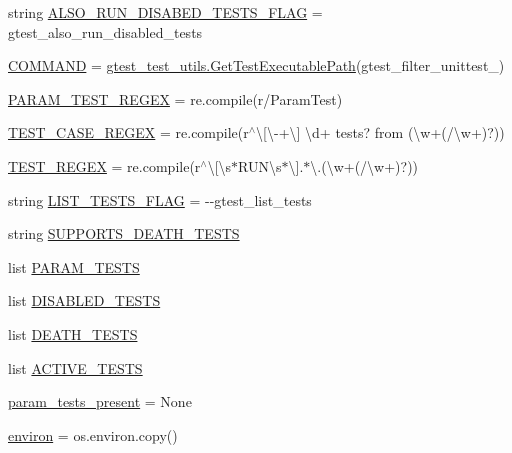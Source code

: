\begin{DoxyCompactItemize}
\item 
string \hyperlink{namespacegtest__filter__unittest_aa2da713fbaa08fdbaa7cd78c45974edf}{A\+L\+S\+O\+\_\+\+R\+U\+N\+\_\+\+D\+I\+S\+A\+B\+E\+D\+\_\+\+T\+E\+S\+T\+S\+\_\+\+F\+L\+AG} = \textquotesingle{}gtest\+\_\+also\+\_\+run\+\_\+disabled\+\_\+tests\textquotesingle{}
\item 
\hyperlink{namespacegtest__filter__unittest_aaf600b005b9c09e727b55b60fdf8f507}{C\+O\+M\+M\+A\+ND} = \hyperlink{namespacegtest__test__utils_a89ed3717984a80ffbb7a9c92f71b86a2}{gtest\+\_\+test\+\_\+utils.\+Get\+Test\+Executable\+Path}(\textquotesingle{}gtest\+\_\+filter\+\_\+unittest\+\_\+\textquotesingle{})
\item 
\hyperlink{namespacegtest__filter__unittest_a8fbf875f4ea83b2d5239a2e99e080526}{P\+A\+R\+A\+M\+\_\+\+T\+E\+S\+T\+\_\+\+R\+E\+G\+EX} = re.\+compile(r\textquotesingle{}/Param\+Test\textquotesingle{})
\item 
\hyperlink{namespacegtest__filter__unittest_a76b555691fb57191f50a4328134fb4d8}{T\+E\+S\+T\+\_\+\+C\+A\+S\+E\+\_\+\+R\+E\+G\+EX} = re.\+compile(r\textquotesingle{}$^\wedge$\textbackslash{}\mbox{[}\textbackslash{}-\/+\textbackslash{}\mbox{]} \textbackslash{}d+ tests? from (\textbackslash{}w+(/\textbackslash{}w+)?)\textquotesingle{})
\item 
\hyperlink{namespacegtest__filter__unittest_a9327e0f4c9fab06a346228cc5bab53f2}{T\+E\+S\+T\+\_\+\+R\+E\+G\+EX} = re.\+compile(r\textquotesingle{}$^\wedge$\textbackslash{}\mbox{[}\textbackslash{}s$\ast$R\+U\+N\textbackslash{}s$\ast$\textbackslash{}\mbox{]}.$\ast$\textbackslash{}.(\textbackslash{}w+(/\textbackslash{}w+)?)\textquotesingle{})
\item 
string \hyperlink{namespacegtest__filter__unittest_a9b3bb8eda9c6b1716e992d433b1e586c}{L\+I\+S\+T\+\_\+\+T\+E\+S\+T\+S\+\_\+\+F\+L\+AG} = \textquotesingle{}-\/-\/gtest\+\_\+list\+\_\+tests\textquotesingle{}
\item 
string \hyperlink{namespacegtest__filter__unittest_a660f467579ec78f8f856b588c6f6f270}{S\+U\+P\+P\+O\+R\+T\+S\+\_\+\+D\+E\+A\+T\+H\+\_\+\+T\+E\+S\+TS}
\item 
list \hyperlink{namespacegtest__filter__unittest_a4c414863f1e2e9ac993ce4afda33f6b9}{P\+A\+R\+A\+M\+\_\+\+T\+E\+S\+TS}
\item 
list \hyperlink{namespacegtest__filter__unittest_affe760ab1e8c4c7b61566076c37c1d69}{D\+I\+S\+A\+B\+L\+E\+D\+\_\+\+T\+E\+S\+TS}
\item 
list \hyperlink{namespacegtest__filter__unittest_ab14d082dc05c07458595606a64616d0b}{D\+E\+A\+T\+H\+\_\+\+T\+E\+S\+TS}
\item 
list \hyperlink{namespacegtest__filter__unittest_a8eb26cb0e0ac81737723cc9d16e1d253}{A\+C\+T\+I\+V\+E\+\_\+\+T\+E\+S\+TS}
\item 
\hyperlink{namespacegtest__filter__unittest_aab31f58fd88fa64c14e6ab5dc5fb8da3}{param\+\_\+tests\+\_\+present} = None
\item 
\hyperlink{namespacegtest__filter__unittest_ab6940a12e110abdd8dea27039f4731ef}{environ} = os.\+environ.\+copy()
\end{DoxyCompactItemize}


